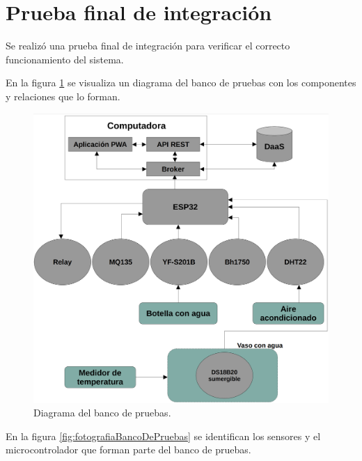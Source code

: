\section{Prueba final de integración}

Se realizó una prueba final de integración para verificar el correcto funcionamiento del sistema.

En la figura \ref{fig:diagramaBancoDePruebas} se visualiza un diagrama del banco de pruebas con los componentes y relaciones que lo forman.

\begin{figure}[H]
	\centering
	\includegraphics[width=1.0\textwidth]{./Figures/Diagrama del banco de pruebas v2.png}
	\caption{Diagrama del banco de pruebas.}
	\label{fig:diagramaBancoDePruebas}
\end{figure}

En la figura \ref{fig:fotografiaBancoDePruebas} se identifican los sensores y el microcontrolador que forman parte del banco de pruebas.

